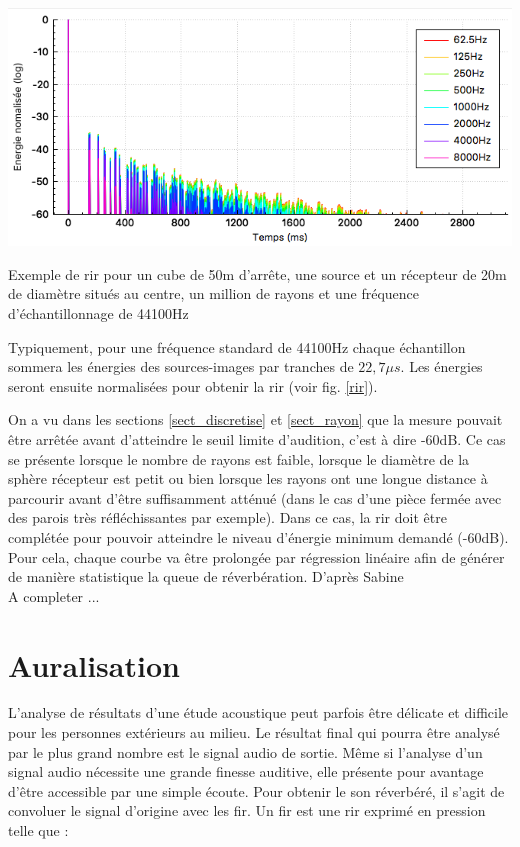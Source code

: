  \begin{figureth}
	\includegraphics[width=0.9\linewidth]{images/rir}
	\caption[Réponse impulsionnelle d'un cube]{Exemple de \gls{rir} pour un cube de 50m d'arrête, une source et un récepteur de 20m de diamètre situés au centre, un million de rayons et une fréquence d'échantillonnage de 44100Hz}
	\label{rir}
\end{figureth}

Typiquement, pour une fréquence standard de 44100Hz chaque échantillon sommera les énergies des sources-images par tranches de $22,7\mu s$. Les énergies seront ensuite normalisées pour obtenir la \gls{rir} (voir fig. \ref{rir}).

On a vu dans les sections \ref{sect_discretise} et \ref{sect_rayon} que la mesure pouvait être arrêtée avant d'atteindre le seuil limite d'audition, c'est à dire -60dB. Ce cas se présente lorsque le nombre de rayons est faible, lorsque le diamètre de la sphère récepteur est petit ou bien lorsque les rayons ont une longue distance à parcourir avant d'être suffisamment atténué (dans le cas d'une pièce fermée avec des parois très réfléchissantes par exemple). Dans ce cas, la \gls{rir} doit être complétée pour pouvoir atteindre le niveau d'énergie minimum demandé (-60dB). Pour cela, chaque courbe va être prolongée par régression linéaire afin de générer de manière statistique la queue de réverbération. D'après Sabine \cite[]{sabine} \\
A completer ...



\section{Auralisation}
 \label{sect_TDS}

L'analyse de résultats d'une étude acoustique peut parfois être délicate et difficile pour les personnes extérieurs au milieu. Le résultat final qui pourra être analysé par le plus grand nombre est le signal audio de sortie. Même si l'analyse d'un signal audio nécessite une grande finesse auditive, elle présente pour avantage d'être accessible par une simple écoute. Pour obtenir le son réverbéré, il s'agit de convoluer le signal d'origine avec les \gls{fir}. Un \gls{fir} est une \gls{rir} exprimé en pression telle que :

